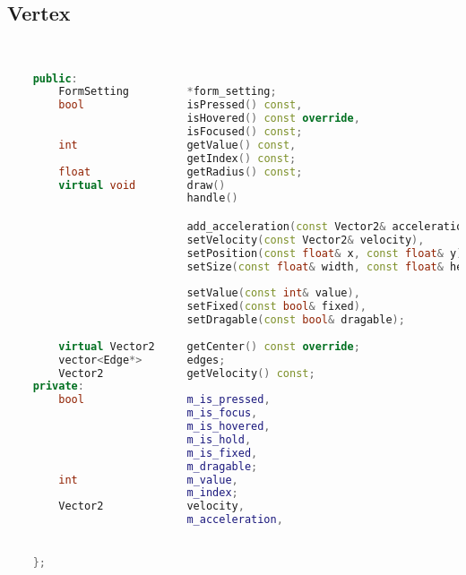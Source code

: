 \subsection{Vertex}
\begin{lstlisting}[language=C++]


    public:
        FormSetting         *form_setting;
        bool                isPressed() const,
                            isHovered() const override,
                            isFocused() const;
        int                 getValue() const,
                            getIndex() const;
        float               getRadius() const;
        virtual void        draw()                                          override,
                            handle()                                        override,

                            add_acceleration(const Vector2& acceleration),
                            setVelocity(const Vector2& velocity),
                            setPosition(const float& x, const float& y)     override,
                            setSize(const float& width, const float& height) override,
    
                            setValue(const int& value),
                            setFixed(const bool& fixed),
                            setDragable(const bool& dragable);
                            
        virtual Vector2     getCenter() const override;
        vector<Edge*>       edges;
        Vector2             getVelocity() const;
    private:
        bool                m_is_pressed,
                            m_is_focus,
                            m_is_hovered,
                            m_is_hold,
                            m_is_fixed,
                            m_dragable;
        int                 m_value,
                            m_index;
        Vector2             velocity,
                            m_acceleration,


    };





\end{lstlisting}

